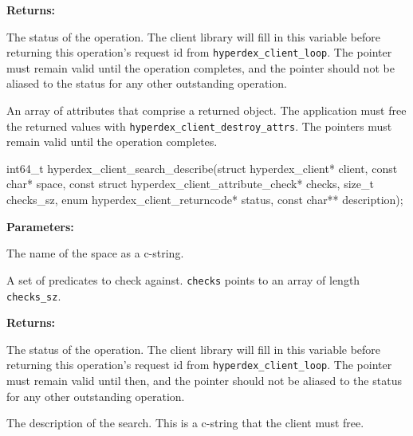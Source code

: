 \noindent\textbf{Returns:}
\begin{description}[labelindent=\widthof{{\texttt{attrs}, \texttt{attrs\_sz}}},leftmargin=*,noitemsep,nolistsep,align=right]
\item[\texttt{status}] The status of the operation.  The client library will fill in this variable before returning this operation's request id from \texttt{hyperdex\_client\_loop}.  The pointer must remain valid until the operation completes, and the pointer should not be aliased to the status for any other outstanding operation.
\item[\texttt{attrs}, \texttt{attrs\_sz}] An array of attributes that comprise a returned object.  The application must free the returned values with \texttt{hyperdex\_client\_destroy\_attrs}.  The pointers must remain valid until the operation completes.
\end{description}

\funcsep
\begin{ccode}
int64_t hyperdex_client_search_describe(struct hyperdex_client* client,
                const char* space,
                const struct hyperdex_client_attribute_check* checks, size_t checks_sz,
                enum hyperdex_client_returncode* status,
                const char** description);
\end{ccode}
\funcdesc 

\noindent\textbf{Parameters:}
\begin{description}[labelindent=\widthof{{\texttt{checks}, \texttt{checks\_sz}}},leftmargin=*,noitemsep,nolistsep,align=right]
\item[\texttt{space}] The name of the space as a c-string.
\item[\texttt{checks}, \texttt{checks\_sz}] A set of predicates to check against.  \texttt{checks} points to an array of length \texttt{checks\_sz}.
\end{description}

\noindent\textbf{Returns:}
\begin{description}[labelindent=\widthof{{\texttt{description}}},leftmargin=*,noitemsep,nolistsep,align=right]
\item[\texttt{status}] The status of the operation.  The client library will fill in this variable before returning this operation's request id from \texttt{hyperdex\_client\_loop}.  The pointer must remain valid until then, and the pointer should not be aliased to the status for any other outstanding operation.
\item[\texttt{description}] The description of the search.  This is a c-string that the client must free.
\end{description}

